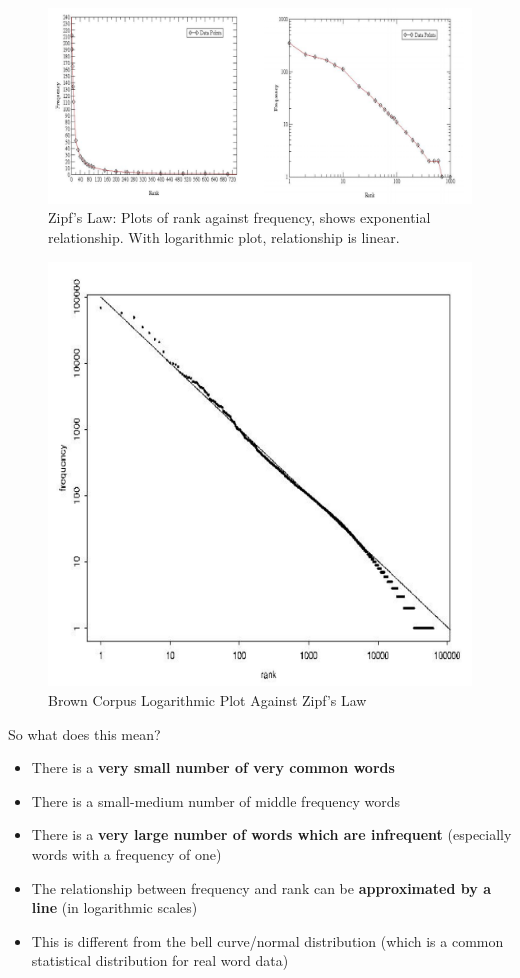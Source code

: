 \documentclass{article}
\begin{document}
\begin{figure}
	\centering
	\includegraphics[scale=0.4]{figures/zipfs-law.png}
	\caption{Zipf's Law: Plots of rank against frequency, shows exponential relationship. With logarithmic plot, relationship is linear.}
	\label{fig:zipf}
\end{figure}

\begin{figure}
	\centering
	\includegraphics[scale=0.4]{figures/brown-zipfs-law.png}
	\caption{Brown Corpus Logarithmic Plot Against Zipf's Law}
	\label{fig:zipf-corpus}
\end{figure}

So what does this mean?
\begin{itemize}
	\item There is a \textbf{very small number of very common words}
	\item There is a small-medium number of middle frequency words
	\item There is a \textbf{very large number of words which are infrequent} (especially words with a frequency of one)
	\item The relationship between frequency and rank can be \textbf{approximated by a line} (in logarithmic scales)
	\item This is different from the bell curve/normal distribution (which is a common statistical distribution for real word data)
\end{itemize}
\end{document}
